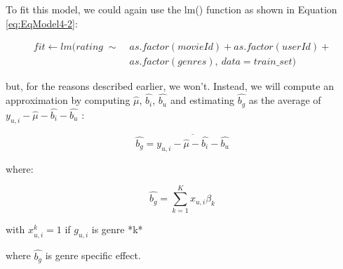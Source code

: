 \documentclass[
]{article}
\begin{document}
To fit this model, we could again use the lm() function as shown in
Equation \ref{eq:EqModel4-2}:

%
\par

\label{eq:EqModel4-2} \begin{equation}
\begin{split}
  fit \leftarrow lm(rating \; \sim \; & as.factor(movieId) + as.factor(userId) + \\ 
  & as.factor(genres), \: data = train\_{}set)
\end{split}
\end{equation}

but, for the reasons described earlier, we won't. Instead, we will
compute an approximation by computing \(\hat{\mu}\), \(\hat{b_{i}}\),
\(\hat{b_{u}}\) and estimating \(\hat{b_{g}}\) as the average of
\(y_{u,i}-\hat{\mu}-\hat{b_{i}}-\hat{b_{u}}\) :

%
\par

\label{eq:EqModel4-3} \begin{equation}
  \hat{b_{g}} = \overline{y_{u,i} - \hat{\mu} - \hat{b_{i}} - \hat{b_{u}}}
\end{equation}

where:

%
\par

\label{eq:EqModel4-4} \begin{equation}
  \hat{b_{g}} = \sum_{k=1}^Kx_{u,i}\beta_k
\end{equation}

\begin{center}
with $x_{u,i}^k=1$ if $g_{u,i}$ is genre *k*
\end{center}

where \(\hat{b_{g}}\) is genre specific effect.
\end{document}
